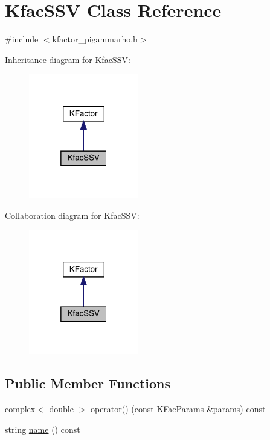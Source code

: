 \hypertarget{classKfacSSV}{}\section{Kfac\+S\+SV Class Reference}
\label{classKfacSSV}


{\ttfamily \#include $<$kfactor\+\_\+pigammarho.\+h$>$}



Inheritance diagram for Kfac\+S\+SV\+:\nopagebreak
\begin{figure}[H]
\begin{center}
\leavevmode
\includegraphics[width=136pt]{df/dda/classKfacSSV__inherit__graph}
\end{center}
\end{figure}


Collaboration diagram for Kfac\+S\+SV\+:\nopagebreak
\begin{figure}[H]
\begin{center}
\leavevmode
\includegraphics[width=136pt]{de/da3/classKfacSSV__coll__graph}
\end{center}
\end{figure}
\subsection*{Public Member Functions}
\begin{DoxyCompactItemize}
\item 
complex$<$ double $>$ \mbox{\hyperlink{classKfacSSV_ad9bddcf643847eebae9926bbc646c56c}{operator()}} (const \mbox{\hyperlink{classKFacParams}{K\+Fac\+Params}} \&params) const
\item 
string \mbox{\hyperlink{classKfacSSV_a72d5e577525fa97365dbcfd4c5bea88d}{name}} () const
\end{DoxyCompactItemize}


